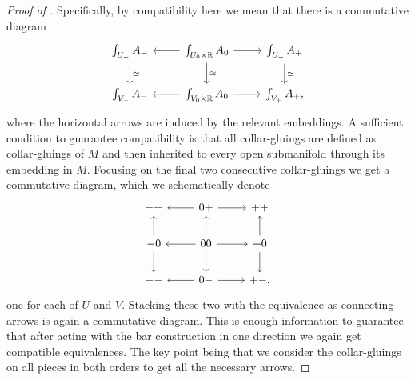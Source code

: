 \documentclass[../text]{subfiles}
\begin{document}
\begin{proof}[Proof of ]
    Specifically, by compatibility here we mean that there is a commutative diagram
    \begin{equation}\label{cd:equivs_from_lc}
        \begin{tikzcd}
            \int_{U_-} A_- \arrow[d, "\simeq"] & \int_{U_0 \times \mathbb{R}} A_0 \arrow[d, "\simeq"] \arrow[l] \arrow[r] & \int_{U_+} A_+ \arrow[d, "\simeq"] \\
            \int_{V_-} A_- & \int_{V_0 \times \mathbb{R}} A_0 \arrow[l] \arrow[r] & \int_{V_+} A_+,
        \end{tikzcd}
    \end{equation}
    where the horizontal arrows are induced by the relevant embeddings. A sufficient condition to guarantee compatibility is that all collar-gluings are defined as collar-gluings of $M$ and then inherited to every open submanifold through its embedding in $M$. Focusing on the final two consecutive collar-gluings we get a commutative diagram, which we schematically denote
    \begin{equation}
        \begin{tikzcd}
            -+ & 0+ \arrow[l] \arrow[r] & ++\\
            -0 \arrow[u] \arrow[d] & 00 \arrow[u] \arrow[l] \arrow[r] \arrow[d] & +0 \arrow[d] \arrow[u] \\
            -- & 0- \arrow[l] \arrow[r] & +-,
        \end{tikzcd}
    \end{equation}
    one for each of $U$ and $V$. Stacking these two with the equivalence as connecting arrows is again a commutative diagram. This is enough information to guarantee that after acting with the bar construction in one direction we again get compatible equivalences. The key point being that we consider the collar-gluings on all pieces in both orders to get all the necessary arrows.


\end{proof}
\end{document}
